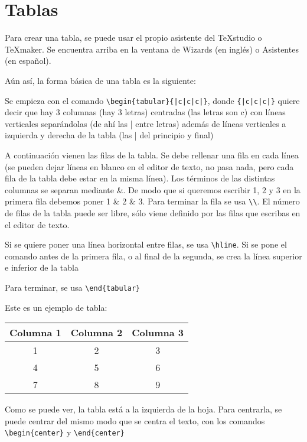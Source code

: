 \chapter{Tablas}

Para crear una tabla, se puede usar el propio asistente del TeXstudio o TeXmaker. Se encuentra arriba en la ventana de Wizards (en inglés) o Asistentes (en español).

Aún así, la forma básica de una tabla es la siguiente:

Se empieza con el comando \verb!\begin{tabular}{|c|c|c|}!, donde \verb!{|c|c|c|}! quiere decir que hay 3 columnas (hay 3 letras) centradas (las letras son c) con líneas verticales separándolas (de ahí las | entre letras) además de líneas verticales a izquierda y derecha de la tabla (las | del principio y final) 

A continuación vienen las filas de la tabla. Se debe rellenar una fila en cada línea (se pueden dejar líneas en blanco en el editor de texto, no pasa nada, pero cada fila de la tabla debe estar en la misma línea). Los términos de las distintas columnas se separan mediante \&. De modo que si queremos escribir 1, 2 y 3 en la primera fila debemos poner 1 \& 2 \& 3. Para terminar la fila se usa \verb!\\!. El número de filas de la tabla puede ser libre, sólo viene definido por las filas que escribas en el editor de texto.

Si se quiere poner una línea horizontal entre filas, se usa \verb!\hline!. Si se pone el comando antes de la primera fila, o al final de la segunda, se crea la línea superior e inferior de la tabla

Para terminar, se usa \verb!\end{tabular}!

Este es un ejemplo de tabla:

\begin{tabular}{|c|c|c|}
	\hline 
	Columna 1 & Columna 2 & Columna 3 \\ 
	\hline 
	1 & 2 & 3 \\ 
	\hline 
	4 & 5 & 6 \\ 
	\hline 
	7 & 8 & 9 \\ 
	\hline 
\end{tabular} 

Como se puede ver, la tabla está a la izquierda de la hoja. Para centrarla, se puede centrar del mismo modo que se centra el texto, con los comandos \verb!\begin{center}! y \verb!\end{center}!


